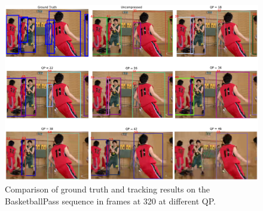 \begin{figure}[!tb]
  \centering
  \includegraphics[width=1.0\linewidth]{img/BasketballPass_0_frame320.pdf}
  \caption[Comparison of ground truth and tracking results on the BasketballPass sequence in frames 320 at different QP]
  {
  Comparison of ground truth and tracking results on the BasketballPass sequence in frames at 320 at different QP.
  }
  \label{fig:BasketballPass_0_frame320}
\end{figure}